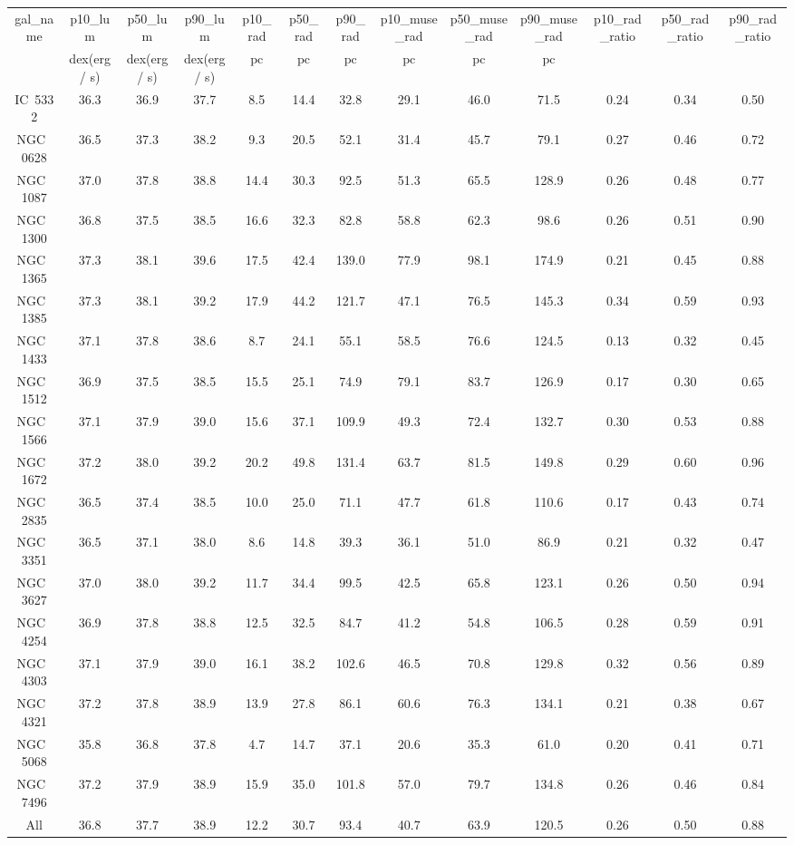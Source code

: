 \begin{table}
\begin{tabular}{ccccccccccccc}
gal_name & p10_lum & p50_lum & p90_lum & p10_rad & p50_rad & p90_rad & p10_muse_rad & p50_muse_rad & p90_muse_rad & p10_rad_ratio & p50_rad_ratio & p90_rad_ratio \\
 & dex(erg / s) & dex(erg / s) & dex(erg / s) & $\mathrm{pc}$ & $\mathrm{pc}$ & $\mathrm{pc}$ & $\mathrm{pc}$ & $\mathrm{pc}$ & $\mathrm{pc}$ & $\mathrm{}$ & $\mathrm{}$ & $\mathrm{}$ \\
IC~5332 & 36.3 & 36.9 & 37.7 & 8.5 & 14.4 & 32.8 & 29.1 & 46.0 & 71.5 & 0.24 & 0.34 & 0.50 \\
NGC~0628 & 36.5 & 37.3 & 38.2 & 9.3 & 20.5 & 52.1 & 31.4 & 45.7 & 79.1 & 0.27 & 0.46 & 0.72 \\
NGC~1087 & 37.0 & 37.8 & 38.8 & 14.4 & 30.3 & 92.5 & 51.3 & 65.5 & 128.9 & 0.26 & 0.48 & 0.77 \\
NGC~1300 & 36.8 & 37.5 & 38.5 & 16.6 & 32.3 & 82.8 & 58.8 & 62.3 & 98.6 & 0.26 & 0.51 & 0.90 \\
NGC~1365 & 37.3 & 38.1 & 39.6 & 17.5 & 42.4 & 139.0 & 77.9 & 98.1 & 174.9 & 0.21 & 0.45 & 0.88 \\
NGC~1385 & 37.3 & 38.1 & 39.2 & 17.9 & 44.2 & 121.7 & 47.1 & 76.5 & 145.3 & 0.34 & 0.59 & 0.93 \\
NGC~1433 & 37.1 & 37.8 & 38.6 & 8.7 & 24.1 & 55.1 & 58.5 & 76.6 & 124.5 & 0.13 & 0.32 & 0.45 \\
NGC~1512 & 36.9 & 37.5 & 38.5 & 15.5 & 25.1 & 74.9 & 79.1 & 83.7 & 126.9 & 0.17 & 0.30 & 0.65 \\
NGC~1566 & 37.1 & 37.9 & 39.0 & 15.6 & 37.1 & 109.9 & 49.3 & 72.4 & 132.7 & 0.30 & 0.53 & 0.88 \\
NGC~1672 & 37.2 & 38.0 & 39.2 & 20.2 & 49.8 & 131.4 & 63.7 & 81.5 & 149.8 & 0.29 & 0.60 & 0.96 \\
NGC~2835 & 36.5 & 37.4 & 38.5 & 10.0 & 25.0 & 71.1 & 47.7 & 61.8 & 110.6 & 0.17 & 0.43 & 0.74 \\
NGC~3351 & 36.5 & 37.1 & 38.0 & 8.6 & 14.8 & 39.3 & 36.1 & 51.0 & 86.9 & 0.21 & 0.32 & 0.47 \\
NGC~3627 & 37.0 & 38.0 & 39.2 & 11.7 & 34.4 & 99.5 & 42.5 & 65.8 & 123.1 & 0.26 & 0.50 & 0.94 \\
NGC~4254 & 36.9 & 37.8 & 38.8 & 12.5 & 32.5 & 84.7 & 41.2 & 54.8 & 106.5 & 0.28 & 0.59 & 0.91 \\
NGC~4303 & 37.1 & 37.9 & 39.0 & 16.1 & 38.2 & 102.6 & 46.5 & 70.8 & 129.8 & 0.32 & 0.56 & 0.89 \\
NGC~4321 & 37.2 & 37.8 & 38.9 & 13.9 & 27.8 & 86.1 & 60.6 & 76.3 & 134.1 & 0.21 & 0.38 & 0.67 \\
NGC~5068 & 35.8 & 36.8 & 37.8 & 4.7 & 14.7 & 37.1 & 20.6 & 35.3 & 61.0 & 0.20 & 0.41 & 0.71 \\
NGC~7496 & 37.2 & 37.9 & 38.9 & 15.9 & 35.0 & 101.8 & 57.0 & 79.7 & 134.8 & 0.26 & 0.46 & 0.84 \\
All & 36.8 & 37.7 & 38.9 & 12.2 & 30.7 & 93.4 & 40.7 & 63.9 & 120.5 & 0.26 & 0.50 & 0.88 \\
\end{tabular}
\end{table}
